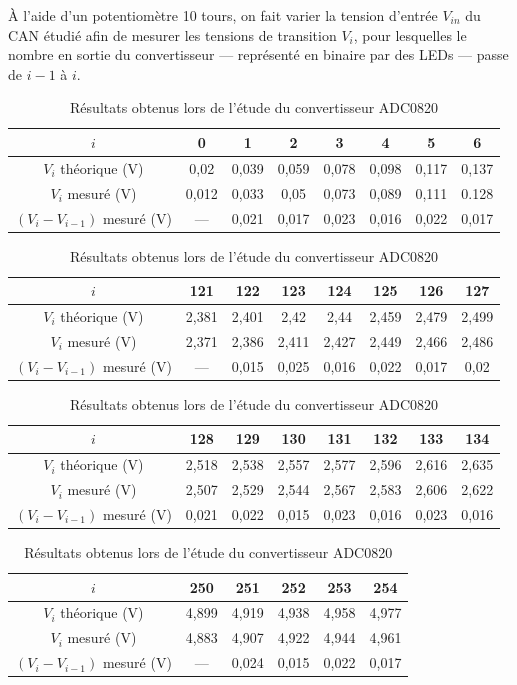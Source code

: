 \documentclass{article}
\begin{document}

À l'aide d'un potentiomètre 10 tours, on fait varier la tension d'entrée $V_{in}$ du CAN étudié afin de mesurer les tensions de transition $V_i$, pour lesquelles le nombre en sortie du convertisseur --- représenté en binaire par des LEDs --- passe de $i-1$ à $i$. %

\begin{table}[h]
\caption{Résultats obtenus lors de l'étude du convertisseur ADC0820}
\label{tab:ADC0820}
\centering
\begin{tabular}{|c|c|c|c|c|c|c|c|}
\hline
$i$             & 0 & 1 & 2 & 3 & 4 & 5 & 6\\
\hline
$V_i$ théorique (V) & 0,02 & 0,039 & 0,059 & 0,078 & 0,098 & 0,117 & 0,137 \\
\hline
$V_i$ mesuré (V)    & 0,012 & 0,033 & 0,05 & 0,073 & 0,089 & 0,111 & 0.128 \\
\hline
$(V_i-V_{i-1})$ mesuré (V) & --- & 0,021 & 0,017 & 0,023 & 0,016 & 0,022 & 0,017\\
\hline
\end{tabular}

\vspace{10pt}

\begin{tabular}{|c|c|c|c|c|c|c|c|}
\hline
$i$             & 121 & 122 & 123 & 124 & 125 & 126 & 127 \\
\hline
$V_i$ théorique (V) & 2,381 & 2,401 & 2,42 & 2,44 & 2,459 & 2,479 & 2,499 \\
\hline
$V_i$ mesuré (V)    & 2,371 & 2,386 & 2,411 & 2,427 & 2,449 & 2,466 & 2,486 \\
\hline
$(V_i-V_{i-1})$ mesuré (V) & --- & 0,015 & 0,025 & 0,016 & 0,022 & 0,017 & 0,02 \\
\hline
\end{tabular}

\begin{tabular}{|c|c|c|c|c|c|c|c|}
\hline
$i$             & 128 & 129 & 130 & 131 & 132 & 133 & 134 \\
\hline
$V_i$ théorique (V) & 2,518 & 2,538 & 2,557 & 2,577 & 2,596 & 2,616 & 2,635 \\
\hline
$V_i$ mesuré (V)    & 2,507 & 2,529 & 2,544 & 2,567 & 2,583 & 2,606 & 2,622 \\
\hline
$(V_i-V_{i-1})$ mesuré (V) & 0,021 & 0,022 & 0,015 & 0,023 & 0,016 & 0,023 & 0,016 \\
\hline
\end{tabular}

\vspace{10pt}

\begin{tabular}{|c|c|c|c|c|c|}
\hline
$i$             & 250 & 251 & 252 & 253 & 254 \\
\hline
$V_i$ théorique (V) & 4,899 & 4,919 & 4,938 & 4,958 & 4,977 \\
\hline
$V_i$ mesuré (V)    & 4,883 & 4,907 & 4,922 & 4,944 & 4,961 \\
\hline
$(V_i-V_{i-1})$ mesuré (V) & --- & 0,024 & 0,015 & 0,022 & 0,017 \\
\hline
\end{tabular}
\end{table}
\end{document}
